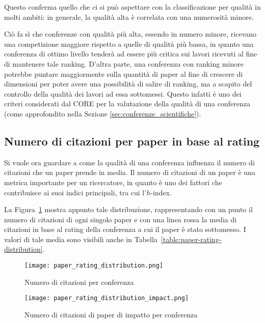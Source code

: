 Questo conferma quello che ci si può aspettare con la classificazione per qualità in molti ambiti: in generale, la qualità alta è correlata
con una numerosità minore.

Ciò fa sì che conferenze con qualità più alta, essendo in numero minore,
ricevano una competizione maggiore rispetto a quelle di qualità più bassa, in
quanto una conferenza di ottimo livello tenderà ad essere più critica sui lavori
ricevuti al fine di mantenere tale ranking. D'altra parte, una conferenza con
ranking minore potrebbe puntare maggiormente sulla quantità di paper al fine di
crescere di dimensioni per poter avere una possibilità di salire di ranking,
ma a scapito del controllo della qualità dei lavori ad essa sottomessi. Questo infatti è uno dei criteri considerati dal CORE per la valutazione della qualità di una conferenza (come approfondito nella Sezione \ref{sec:conferenze_scientifiche}).

\subsection{Numero di citazioni per paper in base al rating}

Si vuole ora guardare a come la qualità di una conferenza influenza il numero
di citazioni che un paper prende in media. Il numero di citazioni di un paper
è una metrica importante per un ricercatore, in quanto è uno dei fattori
che contribuisce ai suoi indici principali, tra cui l'$h$-index.

La Figura~\ref{fig:paper-rating-distribution} mostra appunto tale distribuzione,
rappresentando con un punto il numero di citazioni di ogni singolo paper e
con una linea rossa la media di citazioni in base al rating della conferenza
a cui il paper è stato sottomesso. I valori di tale media sono visibili
anche in Tabella~\ref{table:paper-rating-distribution}.

\begin{figure}[tb]
  \centering
  \texttt{[image: paper\_rating\_distribution.png]}
  \caption{Numero di citazioni per conferenza}
  \label{fig:paper-rating-distribution}
\end{figure}

\begin{figure}[tb]
  \centering
  \texttt{[image: paper\_rating\_distribution\_impact.png]}
  \caption{Numero di citazioni di paper di impatto per conferenza}
  \label{fig:paper-rating-distribution-impact}
\end{figure}

